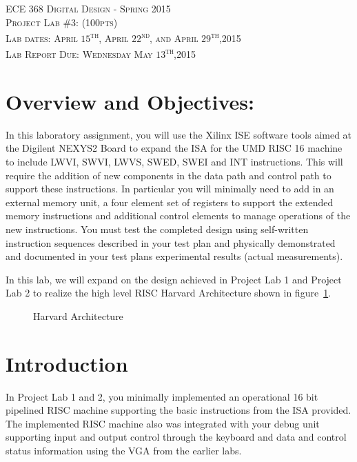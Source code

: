 \documentclass{article}
\begin{document}
\begin{center}
\textsc{\huge ECE 368 Digital Design - Spring 2015}\\[1cm]
\textsc{{\LARGE Project Lab \#3: (100pts)}}\\[0.5cm]
\textsc{\Large Lab dates: April $15$\textsuperscript{th}, April $22$\textsuperscript{nd}, and April $29$\textsuperscript{th},2015}\\[0.5cm]
\textsc{\Large Lab Report Due: Wednesday May $13$\textsuperscript{th},2015}\\[1cm]
\end{center}

\section{Overview and Objectives:}
In this laboratory assignment, you will use the Xilinx ISE software tools aimed at the Digilent NEXYS2 Board to expand the ISA for the UMD RISC 16 machine to include LWVI, SWVI, LWVS, SWED, SWEI and INT instructions. This will require the addition of new components in the data path and control path to support these instructions. In particular you will minimally need to add in an external memory unit, a four element set of registers to support the extended memory instructions and additional control elements to manage operations of the new instructions. You must test the completed design using self-written instruction sequences described in your test plan and physically demonstrated and documented in your test plans experimental results (actual measurements).

In this lab, we will expand on the design achieved in Project Lab 1 and Project Lab 2 to realize the high level RISC Harvard Architecture shown in figure~\ref{fig:harvardarc}.

\begin{figure}[!htbp]
  \centering
  \caption{Harvard Architecture}
  \label{fig:harvardarc}
\end{figure}
\FloatBarrier

\section{Introduction}

In Project Lab 1 and 2, you minimally implemented an operational 16 bit pipelined RISC machine supporting the basic instructions from the ISA provided. The implemented RISC machine also was integrated with your debug unit supporting input and output control through the keyboard and data and control status information using the VGA from the earlier labs. 
\end{document}
